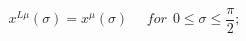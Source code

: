 \begin{equation}\label{eq10.1.ps}
x^{L\mu}(\sigma)=x^{\mu}(\sigma)~~~~~~for~~0\leq\sigma\leq \frac{\pi}{2};
\end{equation}

